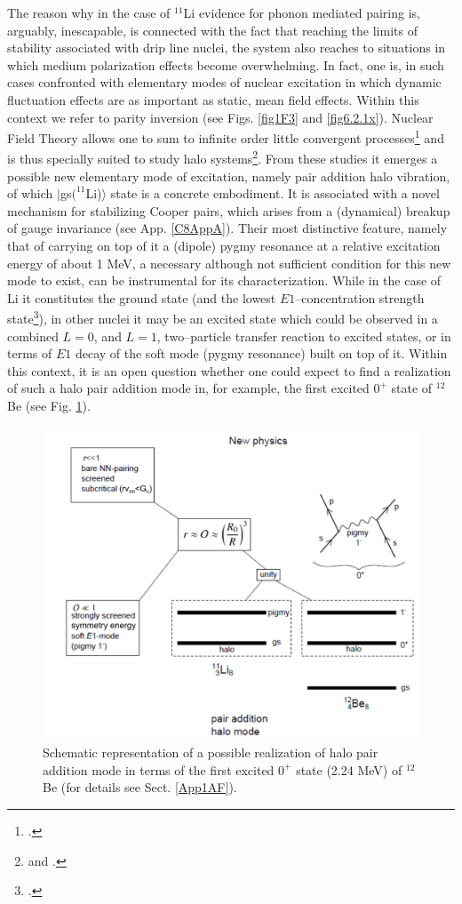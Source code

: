  The reason why in the case of $^{11}$Li evidence for phonon mediated pairing is, arguably, inescapable, is connected with the fact that reaching the limits of stability associated with drip line nuclei, the system also reaches to situations in which medium polarization effects become overwhelming. In fact, one is, in such cases confronted with elementary modes of nuclear excitation in which dynamic fluctuation effects are as important as static, mean field effects. Within this context we refer to  parity inversion (see Figs. \ref{fig1F3}  and \ref{fig6.2.1x}). Nuclear Field Theory  allows one to sum to infinite order little convergent processes\footnote{\cite{Bortignon:78}.} and is thus specially suited to study halo systems\footnote{\citet{Barranco:01} and \citet{Gori:04}.}. From these studies it emerges a possible new elementary mode of excitation, namely pair addition halo vibration, of which $|$gs$(^{11}$Li)$\rangle$ state is a concrete embodiment. It is associated with a novel mechanism  for stabilizing Cooper pairs, which arises from a (dynamical) breakup of gauge invariance (see App. \ref{C8AppA}). Their most distinctive feature, namely that of carrying on top of it a (dipole) pygmy resonance at a relative excitation energy of about 1 MeV, a necessary although not sufficient condition for this new mode to exist, can be instrumental for its characterization. While in the case of Li it constitutes the ground state (and the lowest $E1$--concentration strength state\footnote{\cite{Kanungo:15}.}), in other nuclei  it may be an excited state which could  be  observed in a combined $L=0$, and $L=1$, two--particle transfer reaction to excited states, or in terms of $E1$ decay of the soft mode (pygmy resonance) built on top of it. Within this context, it is an open question whether one could expect to find  a realization of such a halo pair addition mode in, for example, the first excited $0^+$ state of $^{12}$Be (see Fig. \ref{fig8_2_4x}).
   \begin{figure}
   \centerline{\includegraphics*[width=12cm,angle=0]{C8/figsC8/pigmy}}
   	\caption{Schematic representation of a possible realization of halo pair addition mode in terms of the first excited $0^+$ state (2.24 MeV) of $^{12}$Be (for details see Sect. \ref{App1AF}).}\label{fig8_2_4x}
   \end{figure}
   
